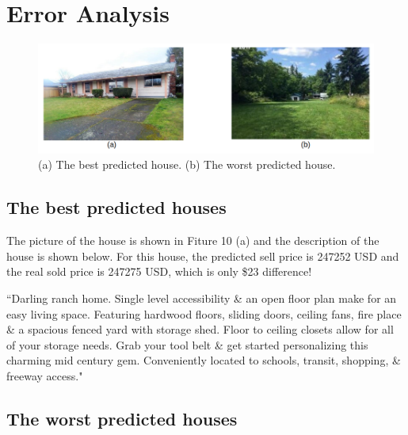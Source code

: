 \documentclass{article} %
\begin{document}

\section{Error Analysis}

\begin{figure}[H]
	\begin{center}
		\includegraphics[width=0.8\linewidth]{fig/houseImg.png}
	\end{center}
	\caption{(a) The best predicted house. (b) The worst predicted house.}
	\label{fig:long}
	\label{fig:onecol}
\end{figure}

\subsection{The best predicted houses}

The picture of the house is shown in Fiture 10 (a) and 
the description of the house is shown below.
For this house, the predicted sell price is 247252 USD and the real sold price is 247275 USD,
which is only \$23 difference!

``Darling ranch home. Single level accessibility \& an open floor plan make for an easy living space. Featuring hardwood floors, sliding doors, ceiling fans, fire place \& a spacious fenced yard with storage shed. Floor to ceiling closets allow for all of your storage needs. Grab your tool belt \& get started personalizing this charming mid century gem. Conveniently located to schools, transit, shopping, \& freeway access."

\subsection{The worst predicted houses}
\end{document}
